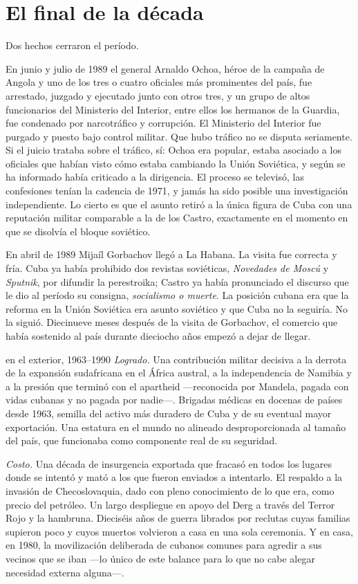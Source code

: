 \section{El final de la década}

Dos hechos cerraron el período.

En junio y julio de 1989 el general Arnaldo Ochoa, héroe de la campaña de Angola
y uno de los tres o cuatro oficiales más prominentes del país, fue arrestado,
juzgado y ejecutado junto con otros tres, y un grupo de altos funcionarios del
Ministerio del Interior, entre ellos los hermanos de la Guardia, fue condenado por
narcotráfico y corrupción. El Ministerio del Interior fue purgado y puesto bajo
control militar. Que hubo tráfico no se disputa seriamente. Si el juicio trataba
sobre el tráfico, sí: Ochoa era popular, estaba asociado a los oficiales que
habían visto cómo estaba cambiando la Unión Soviética, y según se ha informado
había criticado a la dirigencia. El proceso se televisó, las confesiones tenían la
cadencia de 1971, y jamás ha sido posible una investigación independiente. Lo
cierto es que el asunto retiró a la única figura de Cuba con una reputación
militar comparable a la de los Castro, exactamente en el momento en que se
disolvía el bloque soviético.

En abril de 1989 Mijaíl Gorbachov llegó a La Habana. La visita fue correcta y
fría. Cuba ya había prohibido dos revistas soviéticas, \emph{Novedades de Moscú} y
\emph{Sputnik}, por difundir la perestroika; Castro ya había pronunciado el
discurso que le dio al período su consigna, \emph{socialismo o muerte}. La
posición cubana era que la reforma en la Unión Soviética era asunto soviético y
que Cuba no la seguiría. No la siguió. Diecinueve meses después de la visita de
Gorbachov, el comercio que había sostenido al país durante dieciocho años empezó a
dejar de llegar.

\begin{ledger}{en el exterior, 1963--1990}
\emph{Logrado.} Una contribución militar decisiva a la derrota de la expansión
sudafricana en el África austral, a la independencia de Namibia y a la presión
que terminó con el apartheid ---reconocida por Mandela, pagada con vidas cubanas
y no pagada por nadie---. Brigadas médicas en docenas de países desde 1963,
semilla del activo más duradero de Cuba y de su eventual mayor exportación. Una
estatura en el mundo no alineado desproporcionada al tamaño del país, que
funcionaba como componente real de su seguridad.

\emph{Costo.} Una década de insurgencia exportada que fracasó en todos los
lugares donde se intentó y mató a los que fueron enviados a intentarlo. El
respaldo a la invasión de Checoslovaquia, dado con pleno conocimiento de lo que
era, como precio del petróleo. Un largo despliegue en apoyo del Derg a través del
Terror Rojo y la hambruna. Dieciséis años de guerra librados por reclutas cuyas
familias supieron poco y cuyos muertos volvieron a casa en una sola ceremonia. Y
en casa, en 1980, la movilización deliberada de cubanos comunes para agredir a
sus vecinos que se iban ---lo único de este balance para lo que no cabe alegar
necesidad externa alguna---.
\end{ledger}
